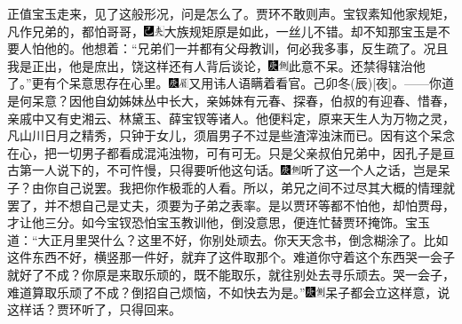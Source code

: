 正值宝玉走来，见了这般形况，问是怎么了。贾环不敢则声。宝钗素知他家规矩，凡作兄弟的，都怕哥哥，{\includegraphics[width=3mm]{../Images/00003}\includegraphics[width=3mm]{../Images/00012}\footnotesize \kaishu 大族规矩原是如此，一丝儿不错。}却不知那宝玉是不要人怕他的。他想着：``兄弟们一并都有父母教训，何必我多事，反生疏了。况且我是正出，他是庶出，饶这样还有人背后谈论，{\includegraphics[width=3mm]{../Images/00004}\includegraphics[width=3mm]{../Images/00011}\footnotesize \kaishu 此意不呆。}还禁得辖治他了。''更有个呆意思存在心里。{{\includegraphics[width=3mm]{../Images/00004}\includegraphics[width=3mm]{../Images/00010}\footnotesize \kaishu 又用讳人语瞒着看官。己卯冬{(辰)}{[}夜{]}。}}------你道是何呆意？因他自幼姊妹丛中长大，亲姊妹有元春、探春，伯叔的有迎春、惜春，亲戚中又有史湘云、林黛玉、薛宝钗等诸人。他便料定，原来天生人为万物之灵，凡山川日月之精秀，只钟于女儿，须眉男子不过是些渣滓浊沫而已。因有这个呆念在心，把一切男子都看成混沌浊物，可有可无。只是父亲叔伯兄弟中，因孔子是亘古第一人说下的，不可忤慢，只得要听他这句话。{\includegraphics[width=3mm]{../Images/00004}\includegraphics[width=3mm]{../Images/00011}\footnotesize \kaishu 听了这一个人之话，岂是呆子？由你自己说罢。我把你作极乖的人看。}所以，弟兄之间不过尽其大概的情理就罢了，并不想自己是丈夫，须要为子弟之表率。是以贾环等都不怕他，却怕贾母，才让他三分。如今宝钗恐怕宝玉教训他，倒没意思，便连忙替贾环掩饰。宝玉道：``大正月里哭什么？这里不好，你别处顽去。你天天念书，倒念糊涂了。比如这件东西不好，横竖那一件好，就弃了这件取那个。难道你守着这个东西哭一会子就好了不成？你原是来取乐顽的，既不能取乐，就往别处去寻乐顽去。哭一会子，难道算取乐顽了不成？倒招自己烦恼，不如快去为是。''{\includegraphics[width=3mm]{../Images/00004}\includegraphics[width=3mm]{../Images/00011}\footnotesize \kaishu 呆子都会立这样意，说这样话？}贾环听了，只得回来。

